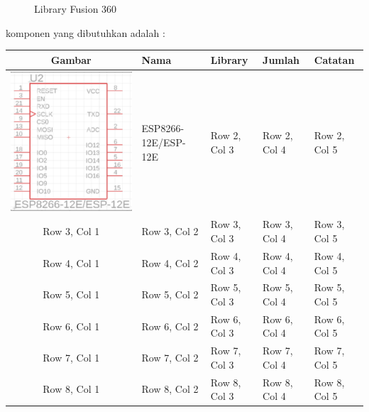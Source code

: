 \begin{enumerate}
\begin{figure}[H]
            \caption{Library Fusion 360} 
            \label{fig:libraryfusion3601}
        \end{figure}
    komponen yang dibutuhkan adalah :
    \vspace{5pt}
    \begin{center}
        \vspace{-\topsep} %
        \begin{tabular}{|c|p{2cm}|m{2cm}|m{2cm}|m{2cm}|}
            \hline
            Gambar & Nama & Library & Jumlah & Catatan \\
            \hline
            \includegraphics[width=0.2\linewidth]{P1/img/ESP8266.png} & ESP8266-
    12E/ESP-12E & Row 2, Col 3 & Row 2, Col 4 & Row 2, Col 5 \\
            \hline
            Row 3, Col 1 & Row 3, Col 2 & Row 3, Col 3 & Row 3, Col 4 & Row 3, Col 5 \\
            \hline
            Row 4, Col 1 & Row 4, Col 2 & Row 4, Col 3 & Row 4, Col 4 & Row 4, Col 5 \\
            \hline
            Row 5, Col 1 & Row 5, Col 2 & Row 5, Col 3 & Row 5, Col 4 & Row 5, Col 5 \\
            \hline
            Row 6, Col 1 & Row 6, Col 2 & Row 6, Col 3 & Row 6, Col 4 & Row 6, Col 5 \\
            \hline
            Row 7, Col 1 & Row 7, Col 2 & Row 7, Col 3 & Row 7, Col 4 & Row 7, Col 5 \\
            \hline
            Row 8, Col 1 & Row 8, Col 2 & Row 8, Col 3 & Row 8, Col 4 & Row 8, Col 5 \\
            \hline
            \end{tabular}
        \vspace{-\topsep} %
    \end{center}
    

\end{enumerate}
